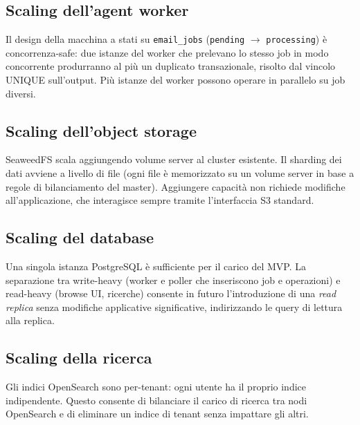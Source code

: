 \subsection{Scaling dell'agent worker}

Il design della macchina a stati su \texttt{email\_jobs} (\texttt{pending} $\rightarrow$
\texttt{processing}) \`e concorrenza-safe: due istanze del worker che prelevano lo stesso
job in modo concorrente produrranno al pi\`u un duplicato transazionale, risolto dal
vincolo UNIQUE sull'output. Pi\`u istanze del worker possono operare in parallelo su
job diversi.

\subsection{Scaling dell'object storage}

SeaweedFS scala aggiungendo volume server al cluster esistente. Il sharding dei dati
avviene a livello di file (ogni file \`e memorizzato su un volume server in base a
regole di bilanciamento del master). Aggiungere capacit\`a non richiede modifiche
all'applicazione, che interagisce sempre tramite l'interfaccia S3 standard.

\subsection{Scaling del database}

Una singola istanza PostgreSQL \`e sufficiente per il carico del MVP. La separazione
tra write-heavy (worker e poller che inseriscono job e operazioni) e read-heavy
(browse UI, ricerche) consente in futuro l'introduzione di una \emph{read replica}
senza modifiche applicative significative, indirizzando le query di lettura alla replica.

\subsection{Scaling della ricerca}

Gli indici OpenSearch sono per-tenant: ogni utente ha il proprio indice indipendente.
Questo consente di bilanciare il carico di ricerca tra nodi OpenSearch e di eliminare
un indice di tenant senza impattare gli altri. 

